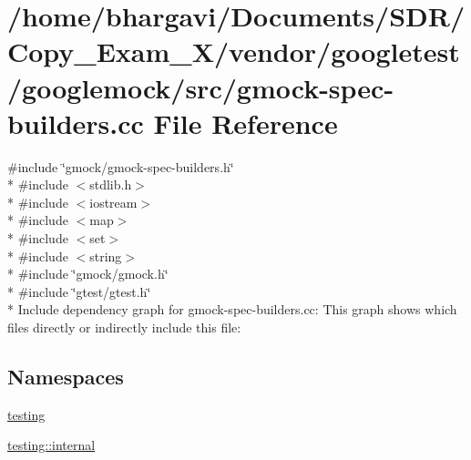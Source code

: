 \hypertarget{gmock-spec-builders_8cc}{}\section{/home/bhargavi/\+Documents/\+S\+D\+R/\+Copy\+\_\+\+Exam\+\_\+X/vendor/googletest/googlemock/src/gmock-\/spec-\/builders.cc File Reference}
\label{gmock-spec-builders_8cc}
{\ttfamily \#include \char`\"{}gmock/gmock-\/spec-\/builders.\+h\char`\"{}}\\*
{\ttfamily \#include $<$stdlib.\+h$>$}\\*
{\ttfamily \#include $<$iostream$>$}\\*
{\ttfamily \#include $<$map$>$}\\*
{\ttfamily \#include $<$set$>$}\\*
{\ttfamily \#include $<$string$>$}\\*
{\ttfamily \#include \char`\"{}gmock/gmock.\+h\char`\"{}}\\*
{\ttfamily \#include \char`\"{}gtest/gtest.\+h\char`\"{}}\\*
Include dependency graph for gmock-\/spec-\/builders.cc\+:
This graph shows which files directly or indirectly include this file\+:
\subsection*{Namespaces}
\begin{DoxyCompactItemize}
\item 
 \hyperlink{namespacetesting}{testing}
\item 
 \hyperlink{namespacetesting_1_1internal}{testing\+::internal}
\end{DoxyCompactItemize}
